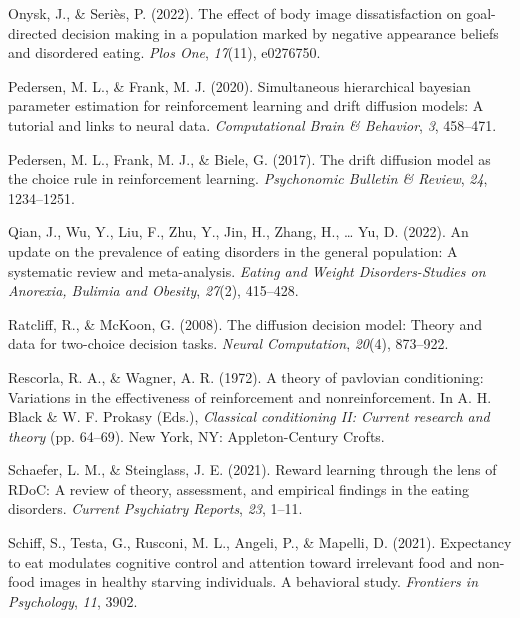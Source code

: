 \documentclass[
  man,floatsintext]{apa6}
\newlength{\cslhangindent}
\newlength{\cslentryspacingunit} %
\newenvironment{CSLReferences}[2] %
 {%
  \setlength{\parindent}{0pt}
  \ifodd #1
  \let\oldpar\par
  \def\par{\hangindent=\cslhangindent\oldpar}
  \fi
  \setlength{\parskip}{#2\cslentryspacingunit}
 }%
 {}
\begin{document}
\begin{CSLReferences}{1}{0}
\leavevmode{}%
Onysk, J., \& Seriès, P. (2022). The effect of body image dissatisfaction on goal-directed decision making in a population marked by negative appearance beliefs and disordered eating. \emph{Plos One}, \emph{17}(11), e0276750.

\leavevmode{}%
Pedersen, M. L., \& Frank, M. J. (2020). Simultaneous hierarchical bayesian parameter estimation for reinforcement learning and drift diffusion models: A tutorial and links to neural data. \emph{Computational Brain \& Behavior}, \emph{3}, 458--471.

\leavevmode{}%
Pedersen, M. L., Frank, M. J., \& Biele, G. (2017). The drift diffusion model as the choice rule in reinforcement learning. \emph{Psychonomic Bulletin \& Review}, \emph{24}, 1234--1251.

\leavevmode{}%
Qian, J., Wu, Y., Liu, F., Zhu, Y., Jin, H., Zhang, H., \ldots{} Yu, D. (2022). An update on the prevalence of eating disorders in the general population: A systematic review and meta-analysis. \emph{Eating and Weight Disorders-Studies on Anorexia, Bulimia and Obesity}, \emph{27}(2), 415--428.

\leavevmode{}%
Ratcliff, R., \& McKoon, G. (2008). The diffusion decision model: Theory and data for two-choice decision tasks. \emph{Neural Computation}, \emph{20}(4), 873--922.

\leavevmode{}%
Rescorla, R. A., \& Wagner, A. R. (1972). A theory of pavlovian conditioning: Variations in the effectiveness of reinforcement and nonreinforcement. In A. H. Black \& W. F. Prokasy (Eds.), \emph{Classical conditioning II: Current research and theory} (pp. 64--69). New York, NY: Appleton-Century Crofts.

\leavevmode{}%
Schaefer, L. M., \& Steinglass, J. E. (2021). Reward learning through the lens of RDoC: A review of theory, assessment, and empirical findings in the eating disorders. \emph{Current Psychiatry Reports}, \emph{23}, 1--11.

\leavevmode{}%
Schiff, S., Testa, G., Rusconi, M. L., Angeli, P., \& Mapelli, D. (2021). Expectancy to eat modulates cognitive control and attention toward irrelevant food and non-food images in healthy starving individuals. A behavioral study. \emph{Frontiers in Psychology}, \emph{11}, 3902.


\end{CSLReferences}
\end{document}
